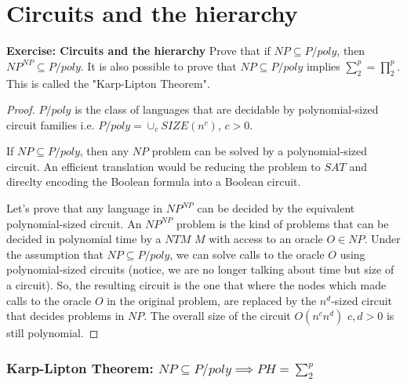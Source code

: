 \documentclass[12pt, a4paper]{article} %
\begin{document}

\section{Circuits and the hierarchy}

\textbf{Exercise: Circuits and the hierarchy} \quad Prove that if $NP \subseteq P/poly$, then $NP^{NP} \subseteq P/poly$. It is also possible to prove that $NP \subseteq P/poly$ implies $\sum_2^p = \prod_2^p$. This is called the "Karp-Lipton Theorem".

\begin{proof}

  $P/poly$ is the class of languages that are decidable by polynomial-sized circuit families i.e. $P/poly = \cup_cSIZE(n^c)$, $c > 0$.

  If $NP \subseteq P/poly$, then any $NP$ problem can be solved by a polynomial-sized circuit. An efficient translation would be reducing the problem to $SAT$ and direclty encoding the Boolean formula into a Boolean circuit.

  Let's prove that any language in $NP^{NP}$ can be decided by the equivalent polynomial-sized circuit. An $NP^{NP}$ problem is the kind of problems that can be decided in polynomial time by a $NTM$ $M$ with access to an oracle $O \in NP$. Under the assumption that $NP \subseteq P/poly$, we can solve calls to the oracle $O$ using polynomial-sized circuits (notice, we are no longer talking about time but size of a circuit). So, the resulting circuit is the one that where the nodes which made calls to the oracle $O$ in the original problem, are replaced by the $n^d$-sized circuit that decides problems in $NP$. The overall size of the circuit $O(n^c n^d)$ $c,d > 0$ is still polynomial.

\end{proof}

  \subsubsection{Karp-Lipton Theorem: $NP \subseteq P/poly \implies PH = \sum_2^p$}
\end{document}
